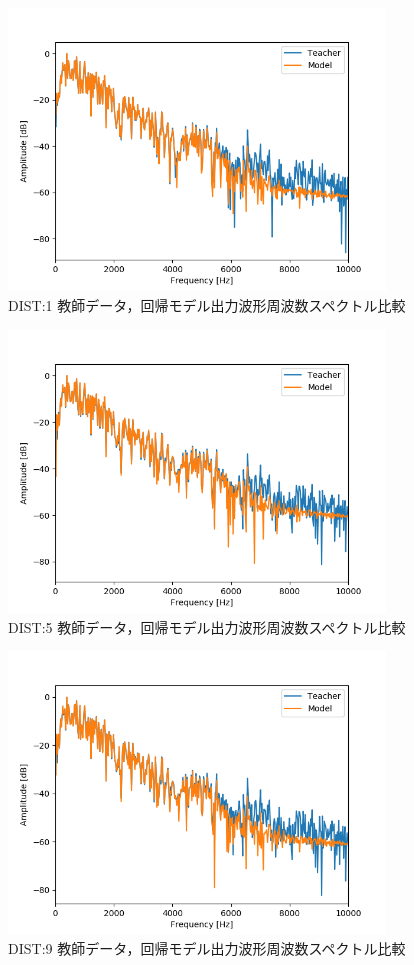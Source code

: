 \documentclass{jreport}		%
\begin{document}
\begin{figure}[htbp]
 \begin{center}
  \includegraphics[width=100mm]{gain1_fft_hikaku.png}
 \end{center}
 \caption{DIST:1 教師データ，回帰モデル出力波形周波数スペクトル比較}
 \label{fig:one}
\end{figure}

\begin{figure}[htbp]
 \begin{center}
  \includegraphics[width=100mm]{gain5_fft_hikaku.png}
 \end{center}
 \caption{DIST:5 教師データ，回帰モデル出力波形周波数スペクトル比較}
 \label{fig:one}
\end{figure}

\begin{figure}[htbp]
 \begin{center}
  \includegraphics[width=100mm]{gain10_fft_hikaku.png}
 \end{center}
 \caption{DIST:9 教師データ，回帰モデル出力波形周波数スペクトル比較}
 \label{fig:one}
\end{figure}
\end{document}
